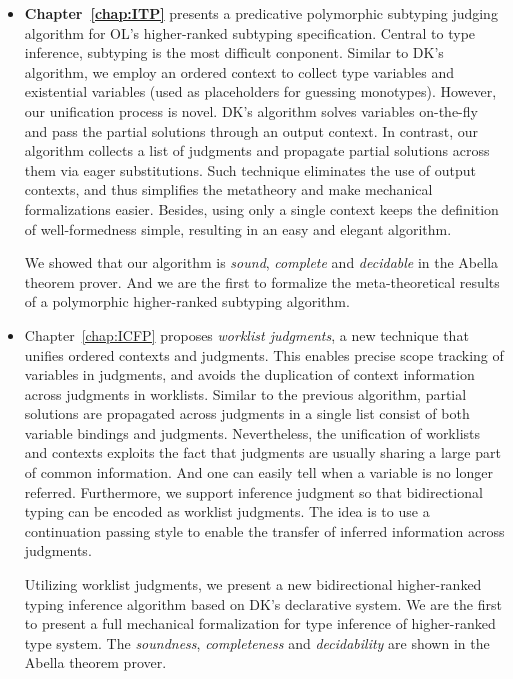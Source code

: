 \begin{itemize}
  \item {\bf Chapter~\ref{chap:ITP}} presents a predicative polymorphic subtyping judging algorithm
    for OL's higher-ranked subtyping specification.
    Central to type inference, subtyping is the most difficult conponent.
    Similar to DK's algorithm, we employ an ordered context to collect
    type variables and existential variables (used as placeholders for guessing monotypes).
    However, our unification process is novel.
    DK's algorithm solves variables on-the-fly and pass the partial solutions through an
    output context.
    In contrast, our algorithm collects a list of judgments and propagate partial solutions
    across them via eager substitutions.
    Such technique eliminates the use of output contexts,
    and thus simplifies the metatheory and make mechanical formalizations easier.
    Besides, using only a single context keeps the definition of well-formedness simple,
    resulting in an easy and elegant algorithm.

    We showed that our algorithm is \emph{sound},
    \emph{complete} and \emph{decidable} in the Abella theorem prover.
    And we are the first to formalize the meta-theoretical results of
    a polymorphic higher-ranked subtyping algorithm.

  \item Chapter~\ref{chap:ICFP}
    proposes \emph{worklist judgments},
    a new technique that unifies ordered contexts and judgments.
    This enables precise scope tracking of variables in judgments,
    and avoids the duplication of context information across judgments in worklists.
    Similar to the previous algorithm, partial solutions are propagated across
    judgments in a single list consist of both variable bindings and judgments.
    Nevertheless, the unification of worklists and contexts exploits the fact
    that judgments are usually sharing a large part of common information.
    And one can easily tell when a variable is no longer referred.
    Furthermore, we support inference judgment so that bidirectional typing can be
    encoded as worklist judgments.
    The idea is to use a continuation passing style to
    enable the transfer of inferred information across judgments.

    Utilizing worklist judgments, we present a new
    bidirectional higher-ranked typing inference algorithm based on DK's declarative system.
    We are the first to present a full mechanical formalization for
    type inference of higher-ranked type system.
    The \emph{soundness}, \emph{completeness} and \emph{decidability} are shown
    in the Abella theorem prover.


\end{itemize}
